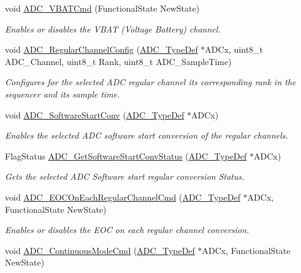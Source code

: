 \begin{DoxyCompactItemize}
void \hyperlink{group___a_d_c_ga17fc58510ddc80024e65d9738ad6e98c}{A\+D\+C\+\_\+\+V\+B\+A\+T\+Cmd} (Functional\+State New\+State)
\begin{DoxyCompactList}\small\item\em Enables or disables the V\+B\+AT (Voltage Battery) channel. \end{DoxyCompactList}\item 
void \hyperlink{group___a_d_c_gac531adb577b648d4bb8881f2ed627d52}{A\+D\+C\+\_\+\+Regular\+Channel\+Config} (\hyperlink{struct_a_d_c___type_def}{A\+D\+C\+\_\+\+Type\+Def} $\ast$A\+D\+Cx, uint8\+\_\+t A\+D\+C\+\_\+\+Channel, uint8\+\_\+t Rank, uint8\+\_\+t A\+D\+C\+\_\+\+Sample\+Time)
\begin{DoxyCompactList}\small\item\em Configures for the selected A\+DC regular channel its corresponding rank in the sequencer and its sample time. \end{DoxyCompactList}\item 
void \hyperlink{group___a_d_c_gac1cd466e725595812c1bbfdad2459ff1}{A\+D\+C\+\_\+\+Software\+Start\+Conv} (\hyperlink{struct_a_d_c___type_def}{A\+D\+C\+\_\+\+Type\+Def} $\ast$A\+D\+Cx)
\begin{DoxyCompactList}\small\item\em Enables the selected A\+DC software start conversion of the regular channels. \end{DoxyCompactList}\item 
Flag\+Status \hyperlink{group___a_d_c_gaf1119583782ecbcec380efcb7eb74883}{A\+D\+C\+\_\+\+Get\+Software\+Start\+Conv\+Status} (\hyperlink{struct_a_d_c___type_def}{A\+D\+C\+\_\+\+Type\+Def} $\ast$A\+D\+Cx)
\begin{DoxyCompactList}\small\item\em Gets the selected A\+DC Software start regular conversion Status. \end{DoxyCompactList}\item 
void \hyperlink{group___a_d_c_ga5316caaa170415ef171c486d8f0bf22d}{A\+D\+C\+\_\+\+E\+O\+C\+On\+Each\+Regular\+Channel\+Cmd} (\hyperlink{struct_a_d_c___type_def}{A\+D\+C\+\_\+\+Type\+Def} $\ast$A\+D\+Cx, Functional\+State New\+State)
\begin{DoxyCompactList}\small\item\em Enables or disables the E\+OC on each regular channel conversion. \end{DoxyCompactList}\item 
void \hyperlink{group___a_d_c_ga879d70e9345d35688590938503f961db}{A\+D\+C\+\_\+\+Continuous\+Mode\+Cmd} (\hyperlink{struct_a_d_c___type_def}{A\+D\+C\+\_\+\+Type\+Def} $\ast$A\+D\+Cx, Functional\+State New\+State)

\end{DoxyCompactItemize}
